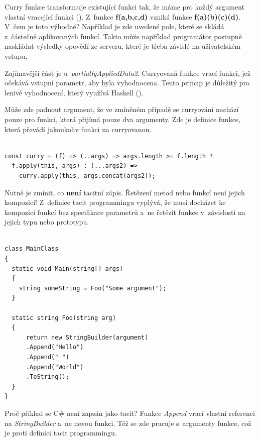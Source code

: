 \documentclass[male, czech]{kithesis}
\newenvironment{code}{\captionsetup{type=listing}}{}
\begin{document}
Curry funkce transformuje existující funkci tak, 
že máme pro každý argument vlastní vracející funkci  (\cite{Currying}). 
Z~funkce \textbf{f(a,b,c,d)} vzniká funkce \textbf{f(a)(b)(c)(d)}.
V~čem je toto výhodné?
Například je zde uvedené pole, 
které se skládá z~částečně aplikovaných funkcí. 
Takto může například programátor postupně naskládat výsledky opovědí ze serveru,
které je třeba závislé na uživatelském vstupu. 

Zajímavější část je u~\textit{partiallyAppliedData2}. 
Curryovaná funkce vrací funkci, 
jež očekává vstupní parametr, 
aby byla vyhodnocena. 
Tento princip je důležitý
pro lenivé vyhodnocení, 
který využívá Haskell (\cite{HaskellCurrying}).

Může zde padnout argument, 
že ve zmíněném případě se curryování nachází pouze pro funkci,
která přijímá pouze dva argumenty. 
Zde je definice funkce, 
která převádí jakoukoliv funkci na curryovanou.

\begin{code}
\begin{verbatim}

const curry = (f) => (..args) => args.length >= f.length ? 
  f.apply(this, args) : (...args2) => 
    curry.apply(this, args.concat(args2));

\end{verbatim}
\end{code}

Nutné je zmínit, 
co \textbf{není} tacitní zápis. 
Řetězení metod nebo funkcí není jejich kompozicí!
Z~definice tacit programmingu vyplývá,
že musí docházet ke kompozici funkcí bez specifikace parametrů
a~ne řetězit funkce v~závislosti na jejich typu nebo prototypu.

\begin{code}
\begin{verbatim}

class MainClass 
{
  static void Main(string[] args)
  {
    string someString = Foo("Some argument");
  }

  static string Foo(string arg)
  {
      return new StringBuilder(argument)
      .Append("Hello")
      .Append(" ")
      .Append("World")
      .ToString();
  }
}

\end{verbatim}
\end{code}

Proč příklad se C\# není zapsán jako tacit? 
Funkce \textit{Append} vrací vlastní referenci na \textit{StringBuilder}
a~ne novou funkci. 
Též se zde pracuje s~argumenty funkce, 
což je proti definici tacit programmingu.
\vfill
\end{document}
